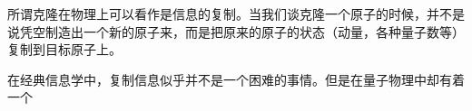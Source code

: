 
所谓克隆在物理上可以看作是信息的复制。当我们谈克隆一个原子的时候，并不是说凭空制造出一个新的原子来，而是把原来的原子的状态（动量，各种量子数等）复制到目标原子上。

在经典信息学中，复制信息似乎并不是一个困难的事情。但是在量子物理中却有着一个